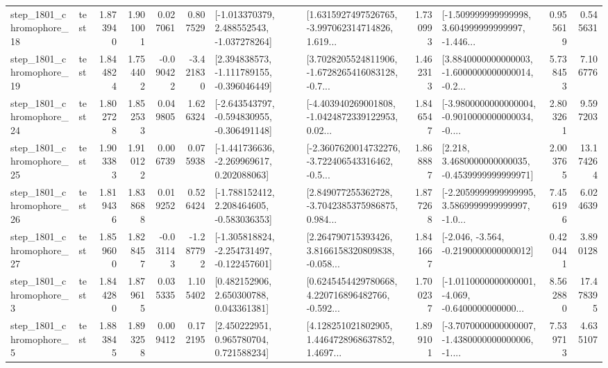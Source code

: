 \begin{tabular}{llrrrrllrlrr}
 step\_1801\_chromophore\_18 &      test &      1.873940 &    1.901001 &      0.027061 &  0.807529 &   [-1.013370379, 2.488552543, -1.037278264] &  [1.6315927497526765, -3.997062314714826, 1.619... &       1.730993 &  [-1.509999999999998, 3.604999999999997, -1.446... &            0.955619 &          0.545631 \\
 step\_1801\_chromophore\_19 &      test &      1.844824 &    1.754402 &     -0.090422 & -3.421830 &   [2.394838573, -1.111789155, -0.396046449] &  [3.7028205524811906, -1.6728265416083128, -0.7... &       1.462313 &  [3.8840000000000003, -1.6000000000000014, -0.2... &            5.738453 &          7.106776 \\
 step\_1801\_chromophore\_24 &      test &      1.802728 &    1.852533 &      0.049805 &  1.626324 &  [-2.643543797, -0.594830955, -0.306491148] &  [-4.403940269001808, -1.0424872339122953, 0.02... &       1.846547 &  [-3.9800000000000004, -0.9010000000000034, -0.... &            2.803261 &          9.597203 \\
 step\_1801\_chromophore\_25 &      test &      1.903383 &    1.910122 &      0.006739 &  0.075938 &   [-1.441736636, -2.269969617, 0.202088063] &  [-2.3607620014732276, -3.722406543316462, -0.5... &       1.868887 &   [2.218, 3.4680000000000035, -0.4539999999999971] &            2.003765 &         13.174264 \\
 step\_1801\_chromophore\_26 &      test &      1.819436 &    1.838688 &      0.019252 &  0.526424 &   [-1.788152412, 2.208464605, -0.583036353] &  [2.849077255362728, -3.7042385375986875, 0.984... &       1.877268 &  [-2.2059999999999995, 3.5869999999999997, -1.0... &            7.456196 &          6.024639 \\
 step\_1801\_chromophore\_27 &      test &      1.859600 &    1.828457 &     -0.031143 & -1.287792 &  [-1.305818824, -2.254731497, -0.122457601] &  [2.264790715393426, 3.8166158320809838, -0.058... &       1.841667 &              [-2.046, -3.564, -0.2190000000000012] &            0.420441 &          3.890128 \\
  step\_1801\_chromophore\_3 &      test &      1.844280 &    1.879615 &      0.035335 &  1.105402 &     [0.482152906, 2.650300788, 0.043361381] &  [0.6245454429780668, 4.220716896482766, -0.592... &       1.700237 &  [-1.0110000000000001, -4.069, -0.6400000000000... &            8.562880 &         17.478395 \\
  step\_1801\_chromophore\_5 &      test &      1.883845 &    1.893258 &      0.009412 &  0.172195 &     [2.450222951, 0.965780704, 0.721588234] &  [4.128251021802905, 1.4464728968637852, 1.4697... &       1.899101 &  [-3.7070000000000007, -1.4380000000000006, -1.... &            7.539713 &          4.635107 \\

\end{tabular}
